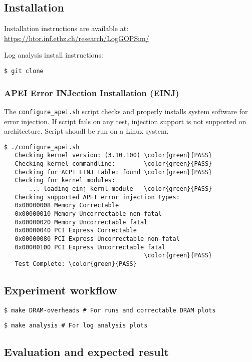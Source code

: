 \subsection{Installation}

Installation instructions are available at: \url{https://htor.inf.ethz.ch/research/LogGOPSim/}

Log analysis install instructions:

{\texttt{\$ git clone }}

\subsubsection{APEI Error INJection Installation (EINJ)}

The {\texttt{configure\_apei.sh}} script checks and properly installs system
software for error injection.  If script fails on any test, injection support is
not supported on architecture.  Script shoudl be run on a Linux system.

\begin{Verbatim}[commandchars=\\\{\}]
 $ ./configure_apei.sh
   Checking kernel version: (3.10.100) \color{green}{PASS}
   Checking kernel commandline:        \color{green}{PASS}
   Checking for ACPI EINJ table: found \color{green}{PASS}
   Checking for kernel modules:
       ... loading einj kernl module   \color{green}{PASS}
   Checking supported APEI error injection types:
   0x00000008 Memory Correctable
   0x00000010 Memory Uncorrectable non-fatal
   0x00000020 Memory Uncorrectable fatal
   0x00000040 PCI Express Correctable
   0x00000080 PCI Express Uncorrectable non-fatal
   0x00000100 PCI Express Uncorrectable fatal
                                       \color{green}{PASS}
   Test Complete: \color{green}{PASS}

\end{Verbatim}

\subsection{Experiment workflow}

{\texttt{\$ make DRAM-overheads \# For \LogGOPSim runs and correctable DRAM plots}}

{\texttt{\$ make analysis \# For log analysis plots}}
\subsection{Evaluation and expected result}

